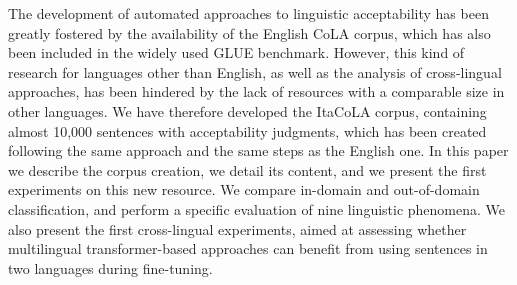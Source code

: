 The development of automated approaches to linguistic acceptability has been greatly fostered by the availability of the English CoLA corpus, which has also been included in the widely used GLUE benchmark. However, this kind of research for languages other than English, as well as  the analysis of cross-lingual approaches, has been hindered by the lack of resources with a comparable size in other languages. We have therefore developed the ItaCoLA corpus, containing almost 10,000 sentences with acceptability judgments, which has been created following the same approach and the same steps as the English one. In this paper we describe the corpus creation, we detail its content, and we present the first experiments on this new resource. We compare in-domain and out-of-domain classification,  and perform a specific evaluation of nine linguistic phenomena. We also present the first cross-lingual experiments, aimed at assessing whether multilingual transformer-based approaches can benefit from using sentences in two languages during fine-tuning.
